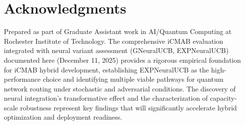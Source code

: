 \documentclass[12pt,a4paper]{article}
\begin{document}
\newpage
\section{Acknowledgments}

Prepared as part of Graduate Assistant work in AI/Quantum Computing at Rochester Institute of Technology. The comprehensive iCMAB evaluation integrated with neural variant assessment (GNeuralUCB, EXPNeuralUCB) documented here (December 11, 2025) provides a rigorous empirical foundation for iCMAB hybrid development, establishing EXPNeuralUCB as the high-performance choice and identifying multiple viable pathways for quantum network routing under stochastic and adversarial conditions. The discovery of neural integration's transformative effect and the characterization of capacity-scale robustness represent key findings that will significantly accelerate hybrid optimization and deployment readiness.
\end{document}
